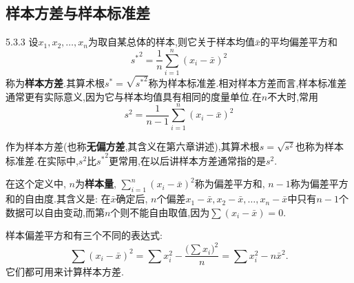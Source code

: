 \subsection{样本方差与样本标准差}
\begin{definition}{}{5.3.3}
设$x_1,x_2,\dotsc,x_n$为取自某总体的样本,则它关于样本均值$\bar x$的平均偏差平方和
\begin{equation}\label{eq:5.3.3}
{s^\ast}^2=\frac1n\sum_{i=1}^n(x_i-\bar x)^2
\end{equation}
称为\textbf{样本方差}.其算术根$s^\ast=\sqrt{{s^\ast}^2}$称为样本标准差.相对样本方差而言,样本标准差通常更有实际意义,因为它与样本均值具有相同的度量单位.在$n$不大时,常用
\begin{equation}\label{eq:5.3.4}
s^2=\frac1{n-1}\sum_{i=1}^n(x_i-\bar x)^2
\end{equation}

作为样本方差(也称\textbf{无偏方差},其含义在第六章讲述),其算术根$s=\sqrt{s^2}$也称为样本标准差.在实际中,$s^2$比${s^\ast}^2$更常用,在以后讲样本方差通常指的是$s^2$.
\end{definition}

在这个定义中, $n$为\textbf{样本量}, $\sum_{i=1}^n(x_i-\bar x)^2$称为偏差平方和, $n-1$称为偏差平方和的自由度.其含义是: 在$\bar x$确定后, $n$个偏差$x_1-\bar x,x_2-\bar x,\dotsc,x_n-\bar x$中只有$n-1$个数据可以自由变动,而第$n$个则不能自由取值,因为$\sum(x_i-\bar x)=0$.

样本偏差平方和有三个不同的表达式:
\begin{equation}\label{eq:5.3.5}
\sum(x_i-\bar x)^2=\sum x_i^2-\frac{\bigl(\sum x_i\bigr)^2}n=\sum x_i^2-n\bar x^2.
\end{equation}
它们都可用来计算样本方差.

